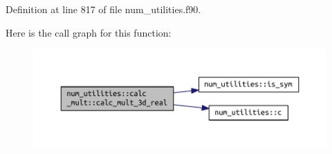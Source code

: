 Definition at line 817 of file num\+\_\+utilities.\+f90.

Here is the call graph for this function\+:\nopagebreak
\begin{figure}[H]
\begin{center}
\leavevmode
\includegraphics[width=350pt]{interfacenum__utilities_1_1calc__mult_aaffbf7ea407fe92d7bd966f5bc424fff_cgraph}
\end{center}
\end{figure}


